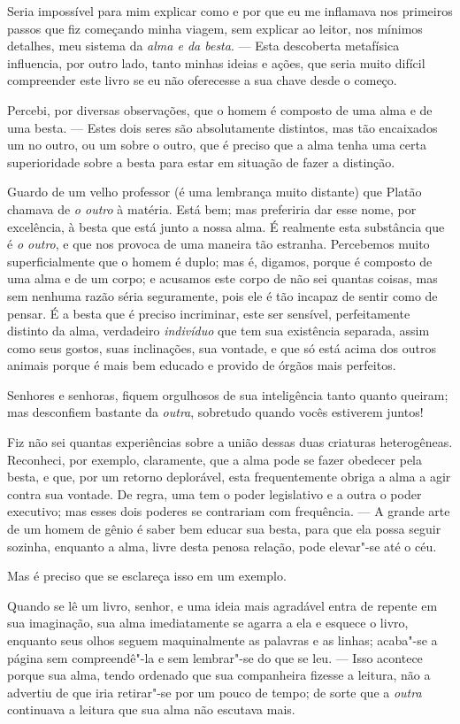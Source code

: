  Seria impossível para mim explicar como e por que eu me inflamava nos
primeiros passos que fiz começando minha viagem, sem explicar ao
leitor, nos mínimos detalhes, meu sistema da \textit{alma e da besta}.
--- Esta descoberta metafísica influencia, por outro lado, tanto minhas
ideias e ações, que seria muito difícil compreender este livro se eu
não oferecesse a sua chave desde o começo.

 Percebi, por diversas observações, que o homem é composto de uma alma e
de uma besta. --- Estes dois seres são absolutamente distintos, mas tão
encaixados um no outro, ou um sobre o outro, que é preciso que a alma
tenha uma certa superioridade sobre a besta para estar em situação de
fazer a distinção.

 Guardo de um velho professor (é uma lembrança muito distante) que
Platão chamava de \textit{o outro} à matéria. Está bem; mas preferiria
dar esse nome, por excelência, à besta que está junto a nossa alma. É
realmente esta substância que é \textit{o outro}, e que nos provoca de
uma maneira tão estranha. Percebemos muito superficialmente que o homem
é duplo; mas é, digamos, porque é composto de uma alma e de um corpo; e
acusamos este corpo de não sei quantas coisas, mas sem nenhuma razão
séria seguramente, pois ele é tão incapaz de sentir como de pensar. É a
besta que é preciso incriminar, este ser sensível, perfeitamente
distinto da alma, verdadeiro \textit{indivíduo} que tem sua existência
separada, assim como seus gostos, suas inclinações, sua vontade, e que
só está acima dos outros animais porque é mais bem educado e provido de
órgãos mais perfeitos.

 Senhores e senhoras, fiquem orgulhosos de sua inteligência tanto quanto
queiram; mas desconfiem bastante da\textit{ outra}, sobretudo quando
vocês estiverem juntos!

 Fiz não sei quantas experiências sobre a união dessas duas criaturas
heterogêneas. Reconheci, por exemplo, claramente, que a alma pode se
fazer obedecer pela besta, e que, por um retorno deplorável, esta
frequentemente obriga a alma a agir contra sua vontade. De regra, uma
tem o poder legislativo e a outra o poder executivo; mas esses dois
poderes se contrariam com frequência. --- A grande arte de um homem de
gênio é saber bem educar sua besta, para que ela possa seguir sozinha,
enquanto a alma, livre desta penosa relação, pode elevar"-se até o céu. 

 Mas é preciso que se esclareça isso em um exemplo.

 Quando se lê um livro, senhor, e uma ideia mais agradável entra de
repente em sua imaginação, sua alma imediatamente se agarra a ela e
esquece o livro, enquanto seus olhos seguem maquinalmente as palavras e
as linhas; acaba"-se a página sem compreendê"-la e sem lembrar"-se do que
se leu. --- Isso acontece porque sua alma, tendo ordenado que sua
companheira fizesse a leitura, não a advertiu de que iria retirar"-se
por um pouco de tempo; de sorte que a \textit{outra} continuava a
leitura que sua alma não escutava mais.

